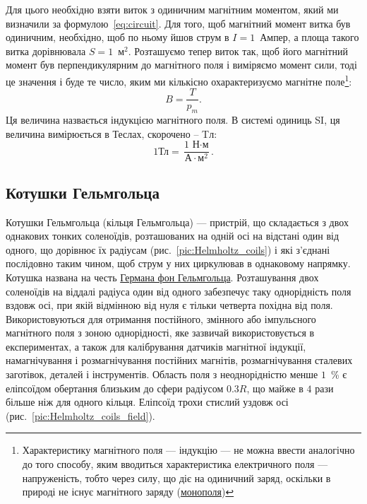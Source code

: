 \documentclass{LabWorkTemplate}
\begin{document}
Для цього необхідно взяти виток з одиничним магнітним моментом, який ми визначили за формулою~\eqref{eq:circuit}. Для  того, щоб магнітний момент витка був одиничним, необхідно, щоб по ньому йшов струм в $I = 1$~Ампер, а площа такого витка дорівнювала $S = 1$~м$^2$. Розташуємо тепер виток так, щоб його магнітний момент був перпендикулярним до магнітного поля і виміряємо момент сили, тоді це значення і буде те число, яким ми кількісно охарактеризуємо магнітне поле\footnote{Характеристику магнітного поля --- індукцію --- не можна ввести аналогічно до того способу, яким вводиться характеристика електричного поля --- напруженість, тобто через силу, що діє на одиничний заряд, оскільки в природі не існує магнітного заряду (\href{https://en.wikipedia.org/wiki/Magnetic_monopole}{монополя}) }:
\begin{equation}\label{B}
	B = \frac{T}{p_m}.
\end{equation}
Ця величина назвається індукцією магнітного поля. В системі одиниць SI, ця величина вимірюється в Теслах, скорочено -- Tл:
\begin{equation}
	1 \text{Тл} = \frac{\text{1 Н}\cdot\text{м}}{\text{А}\cdot\text{м}^2}.
\end{equation}

\subsection{Котушки Гельмгольца}

Котушки Гельмгольца (кільця Гельмгольца) --- пристрій, що складається з двох однакових тонких соленоїдів, розташованих на одній осі на відстані один від одного, що дорівнює їх радіусам (рис.~\ref{pic:Helmholtz_coils}) і які з'єднані послідовно таким чином, щоб струм у них циркулював в однаковому напрямку. Котушка названа на честь \href{https://en.wikipedia.org/wiki/Hermann_von_Helmholtz}{Германа фон Гельмгольца}. Розташування двох соленоїдів на віддалі радіуса один від одного забезпечує таку однорідність поля вздовж осі, при якій відмінною від нуля є тільки четверта похідна від поля. Використовуються для отримання постійного, змінного або імпульсного магнітного поля з зоною однорідності, яке зазвичай використовується в експериментах, а також для калібрування датчиків магнітної індукції, намагнічування і розмагнічування постійних магнітів, розмагнічування сталевих заготівок, деталей і інструментів. Область поля з неоднорідністю менше $1$~\% є еліпсоїдом обертання близьким до сфери радіусом $0.3R$, що майже в $4$ рази більше ніж для одного кільця. Еліпсоїд трохи стислий уздовж осі (рис.~\ref{pic:Helmholtz_coils_field}).
\end{document}
